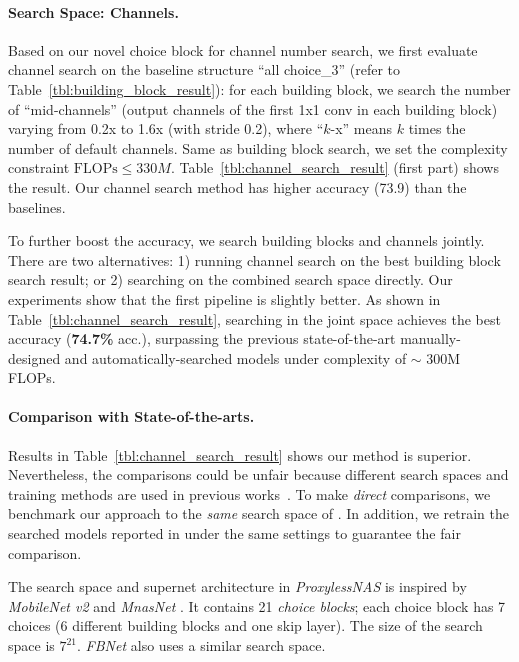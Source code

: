 \paragraph{Search Space: Channels. } Based on our novel choice block for channel number search, we first evaluate channel search on the baseline structure ``all choice\_3'' (refer to Table~\ref{tbl:building_block_result}): for each building block, we search the number of ``mid-channels'' (output channels of the first 1x1 conv in each building block) varying from 0.2x to 1.6x (with stride 0.2), where ``$k$-x'' means $k$ times the number of default channels. Same as building block search, we set the complexity constraint $\text{FLOPs} \le 330M$. Table~\ref{tbl:channel_search_result} (first part) shows the result. Our channel search method has higher accuracy (73.9) than the baselines.

To further boost the accuracy, we search building blocks and channels jointly. There are two alternatives: 1) running channel search on the best building block search result; or 2) searching on the combined search space directly. Our experiments show that the first pipeline is slightly better. As shown in Table~\ref{tbl:channel_search_result}, searching in the joint space achieves the best accuracy (\textbf{74.7\%} acc.), surpassing the previous state-of-the-art manually-designed \cite{ma2018shufflenet,sandler2018mobilenetv2} and automatically-searched models \cite{tan2018mnasnet,zoph2018learning,liu2018progressive,liu2018darts,cai2018proxylessnas,wu2018fbnet} under complexity of $\sim$ 300M FLOPs.

\paragraph{Comparison with State-of-the-arts. } Results in  Table~\ref{tbl:channel_search_result} shows our method is superior. Nevertheless, the comparisons could be unfair because different search spaces and training methods are used in previous works~\cite{cai2018proxylessnas}. To make \emph{direct} comparisons, we benchmark our approach to the \emph{same} search space of \cite{cai2018proxylessnas,wu2018fbnet}. In addition, we retrain the searched models reported in \cite{cai2018proxylessnas,wu2018fbnet} under the same settings to guarantee the fair comparison. 

The search space and supernet architecture in \emph{ProxylessNAS} \cite{cai2018proxylessnas} is inspired by \emph{MobileNet v2} \cite{sandler2018mobilenetv2} and \emph{MnasNet} \cite{tan2018mnasnet}. It contains 21 \emph{choice blocks}; each choice block has 7 choices (6 different building blocks and one skip layer). The size of the search space is $7^{21}$. \emph{FBNet} \cite{wu2018fbnet} also uses a similar search space.

